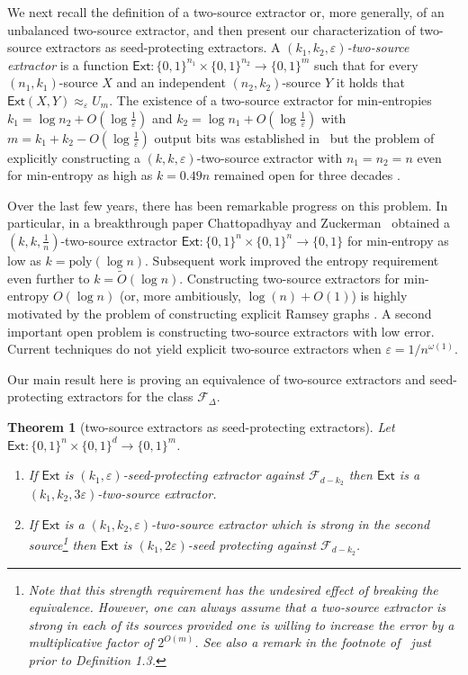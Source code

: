\documentclass[11pt]{article}
\numberwithin{equation}{section}
\newtheorem{theorem}{Theorem}[section]
\theoremstyle{definition}
\theoremstyle{plain}
\newcommand{\ext}{\mathsf{Ext}}
\newcommand{\eps}{\varepsilon}
\def\poly{{\mathrm{poly}}}
\begin{document}
We next recall the definition of a two-source extractor or, more generally, of
an %
unbalanced two-source %
%
extractor,  %
and then present our characterization of two-source extractors as seed-protecting extractors. A \emph{$(k_1,k_2,\eps)$-two-source extractor} is a function $\ext \colon \{0,1\}^{n_1} \times \{0,1\}^{n_2} \to \{0,1\}^m$ such that for every $(n_1,k_1)$-source $X$ and an independent $(n_2,k_2)$-source $Y$ it holds that $\ext(X,Y) \approx_\eps U_m$. The existence of a two-source extractor for min-entropies $k_1 = \log{n_2}+ O(\log\frac1{\eps})$ and $k_2 = \log{n_1} + O(\log\frac1{\eps})$ with $m=k_1+k_2-O(\log\frac1{\eps})$ output bits was established %
%
in~\cite{CG88}  %
but the problem of explicitly constructing a $(k,k,\eps)$-two-source extractor with $n_1 = n_2 = n$ even for min-entropy as high as $k = 0.49n$ remained open for three decades \cite{CG88,Bourgain05,Raz05}.

Over the last few years, there has been remarkable progress on this problem. In particular, in a breakthrough %
paper %
Chattopadhyay and Zuckerman~\cite{CZ19}  obtained a $(k,k,\frac1{n})$-two-source extractor $\ext \colon \{0,1\}^n \times \{0,1\}^n \to \{0,1\}$ for min-entropy as low as $k = \poly(\log{n})$. %
Subsequent  %
work
\cite{BADTS17,Cohen17,Li19} improved the entropy requirement even further to $k = \widetilde{O}(\log{n})$. Constructing two-source extractors for min-entropy $O(\log{n})$ (or, more ambitiously, $\log(n)+O(1)$) is highly motivated by the problem of constructing explicit Ramsey graphs \cite{BKSSW10,BRSW12,Cohen16,Cohen17}. A second important open problem is constructing two-source extractors with low error. Current techniques do not yield explicit two-source extractors when 
%
%
$\eps = 1/n^{\omega(1)}$. 
%



Our main result here is proving an equivalence of two-source extractors and seed-protecting extractors for the class $\mathcal{F}_{\Delta}$.  %
%
%


%
\begin{theorem}[two-source extractors as seed-protecting extractors]  %
\label{thm:two source sp intro}
	Let $\ext \colon \{0,1\}^n \times \{0,1\}^d \to \{0,1\}^m$. 
	\begin{enumerate}
		\item If $\ext$ is $(k_1,\eps)$-seed-protecting extractor against $\mathcal{F}_{d-k_2}$ then $\ext$ is a $(k_1,k_2,3\eps)$-two-source extractor.
		\item If $\ext$ is a $(k_1,k_2,\eps)$-two-source extractor which is strong in the second source\footnote{Note that this %
strength %
requirement has the undesired effect of breaking the equivalence. However, one can always assume that a two-source extractor is strong in each of its sources provided one is willing to increase the error by a multiplicative factor of $2^{O(m)}$. See also a remark in the footnote of~\cite{Raz05} just prior to Definition 1.3.} then $\ext $ is $(k_1,2\eps)$-seed protecting against $\mathcal{F}_{d-k_2}$.
	\end{enumerate}
\end{theorem}
\end{document}
